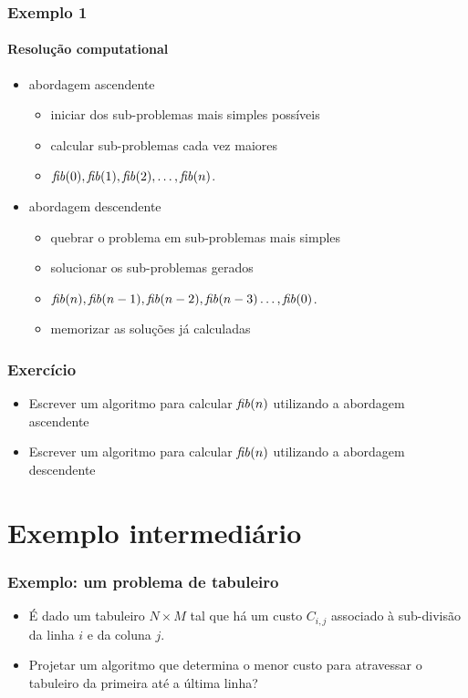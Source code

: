 \documentclass{beamer}
\begin{document}
\begin{frame}

\frametitle{Exemplo 1}
\framesubtitle{Resolução computational}

\begin{itemize}
\item abordagem ascendente
\begin{itemize}
\item iniciar dos sub-problemas mais simples possíveis
\item calcular sub-problemas cada vez maiores
\item $\id{fib}(0), \id{fib}(1), \id{fib}(2), \ldots , \id{fib}(n)$.
\end{itemize}
\item abordagem descendente
\begin{itemize}
\item quebrar o problema em sub-problemas mais simples
\item solucionar os sub-problemas gerados
\item $\id{fib}(n), \id{fib}(n-1), \id{fib}(n-2), \id{fib}(n-3) \ldots , \id{fib}(0)$.
\item \alert{memorizar} as soluções já calculadas
\end{itemize}
\end{itemize}

\end{frame}

\begin{frame}

\frametitle{Exercício}

\begin{itemize}
\item Escrever um algoritmo para calcular $\id{fib}(n)$ utilizando a abordagem
ascendente
\item Escrever um algoritmo para calcular $\id{fib}(n)$ utilizando a abordagem
descendente
\end{itemize}

\end{frame}

\section{Exemplo intermediário}

\begin{frame}
\frametitle{Exemplo: um problema de tabuleiro}

\begin{itemize}
\item É dado um tabuleiro $N \times M$ tal que há um custo $C_{i, j}$ associado
  à sub-divisão da linha $i$ e da coluna $j$.

\item Projetar um algoritmo que determina o menor custo para atravessar o
  tabuleiro da primeira até a última linha?

\end{itemize}

\end{frame}
\end{document}
